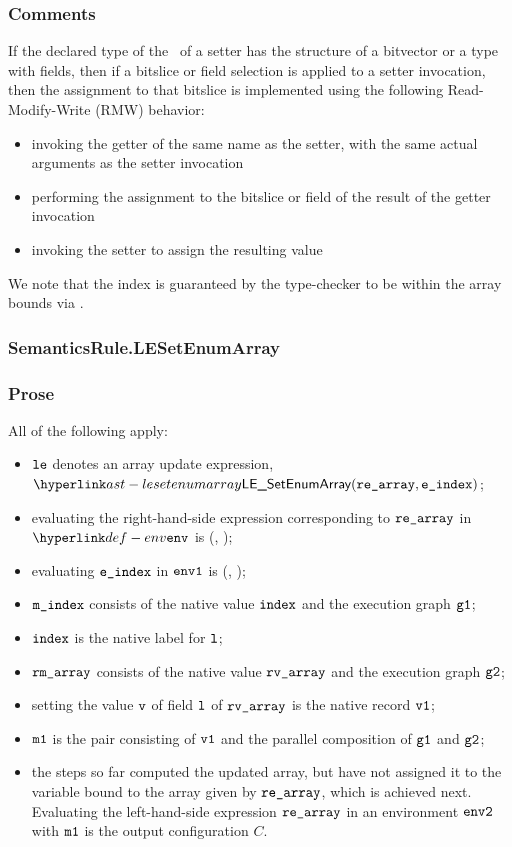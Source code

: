 \subsubsection{Comments}
If the declared type of the \rhsexpression\ of a setter has the structure of a
bitvector or a type with fields, then if a bitslice or field selection is
applied to a setter invocation, then the assignment to that bitslice is
implemented using the following Read-Modify-Write (RMW) behavior:
\begin{itemize}
\item invoking the getter of the same name as the setter, with the same actual
arguments as the setter invocation
\item performing the assignment to the bitslice or field of the result of the
getter invocation
\item invoking the setter to assign the resulting value
\end{itemize}

We note that the index is guaranteed by the type-checker to be within the array bounds
via .

\subsubsection{SemanticsRule.LESetEnumArray\label{sec:SemanticsRule.LESetEnumArray}}
\subsubsection{Prose}
All of the following apply:
\begin{itemize}
  \item $\texttt{le}$ denotes an array update expression, $\LESetEnumArray(\rearray, \eindex)$;
  \item evaluating the right-hand-side expression corresponding to $\texttt{re\_array}$ in $\env$
  is \Normal(\rmarray, \envone)\ProseOrAbnormal;
  \item evaluating $\texttt{e\_index}$ in $\texttt{env1}$ is \Normal(\mindex, \envtwo)\ProseOrAbnormal;
  \item $\texttt{m\_index}$ consists of the native value $\texttt{index}$ and the execution graph $\texttt{g1}$;
  \item $\texttt{index}$ is the native label for $\texttt{l}$;
  \item $\texttt{rm\_array}$ consists of the native value $\texttt{rv\_array}$ and the execution graph $\texttt{g2}$;
  \item setting the value $\texttt{v}$ of field $\texttt{l}$ of $\texttt{rv\_array}$ is the native record $\texttt{v1}$;
  \item $\texttt{m1}$ is the pair consisting of $\texttt{v1}$ and the parallel composition of $\texttt{g1}$ and $\texttt{g2}$;
  \item the steps so far computed the updated array, but have not assigned it to the variable
  bound to the array given by $\texttt{re\_array}$, which is achieved next.
  Evaluating the left-hand-side expression $\texttt{re\_array}$ in an environment $\texttt{env2}$ with $\texttt{m1}$
  is the output configuration $C$.
\end{itemize}

